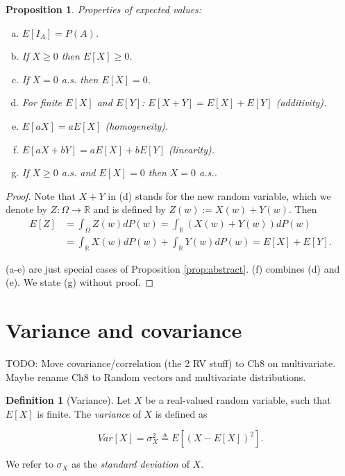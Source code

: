 \documentclass{book}
\theoremstyle{plain}%
\newtheorem{proposition}{Proposition}[section]
\theoremstyle{definition}
\newtheorem{definition}{Definition}[section]
\begin{document}
\begin{proposition}

Properties of expected values:

\begin{enumerate}[(a)]
\item $E[I_A] = P(A)$.
\item If $X \geq 0$ then $E[X] \geq 0$.
\item If $X = 0$ a.s. then $E[X] = 0$.
\item For finite $E[X]$ and $E[Y]$: $E[X+Y] = E[X] + E[Y]$ \emph{(additivity)}.
\item $E[aX] = aE[X]$ \emph{(homogeneity)}.
\item $E[aX + bY] = aE[X] + bE[Y]$ \emph{(linearity)}.
\item If $X \geq 0$ a.s. and $E[X] = 0$ then $X = 0$ a.s..
\end{enumerate}\label{prop:properties_of_expectation}
\end{proposition}

\begin{proof} Note that $X+Y$ in (d) stands for the new random variable, which we denote by $Z:\Omega\to \mathbb{R}$ and is defined by $Z(w):=X(w)+Y(w)$. Then  
    \begin{align*}
    E[Z]
    &=\int_\Omega Z(w) dP(w)
    =\int_{\mathbb{R}} (X(w)+Y(w)) dP(w)\\
    &=
    \int_{\mathbb{R}} X(w)dP(w)
    +
    \int_{\mathbb{R}} Y(w) dP(w)
    =E[X]+E[Y].
    \end{align*}
    
(a-e) are just special cases of Proposition \ref{prop:abstract}. (f) combines (d) and (e). We state (g) without proof.
\end{proof}


\section{Variance and covariance}

TODO: Move covariance/correlation (the 2 RV stuff) to Ch8 on multivariate. Maybe rename Ch8 to Random vectors and multivariate distributions.

\begin{definition}[Variance] Let $X$ be a real-valued random variable, such that $E[X]$ is finite.  The \emph{variance} of $X$ is defined as

$$Var[X] = \sigma^2_{X} \triangleq E[(X - E[X])^2].$$

We refer to $\sigma_X$ as the\emph{ standard deviation} of $X$.
\end{definition}
\end{document}
